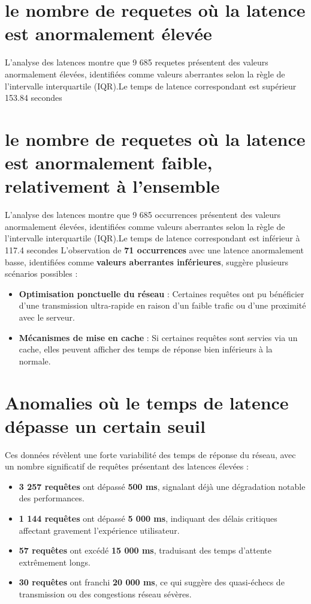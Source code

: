 \section{ le nombre de requetes où la latence est anormalement élevée}
L'analyse des latences montre que 9 685 requetes  présentent des valeurs anormalement élevées, identifiées comme valeurs aberrantes selon la règle de l'intervalle interquartile (IQR).Le temps de latence correspondant est supérieur 153.84 secondes

\section{ le nombre de requetes où la latence est anormalement faible, relativement à l'ensemble}
L'analyse des latences montre que 9 685 occurrences présentent des valeurs anormalement élevées, identifiées comme valeurs aberrantes selon la règle de l'intervalle interquartile (IQR).Le temps de latence correspondant est inférieur à 117.4 secondes
L'observation de \textbf{71 occurrences} avec une latence anormalement basse, identifiées comme \textbf{valeurs aberrantes inférieures}, suggère plusieurs scénarios possibles :

\begin{itemize}
	\item \textbf{Optimisation ponctuelle du réseau} : Certaines requêtes ont pu bénéficier d'une transmission ultra-rapide en raison d'un faible trafic ou d'une proximité avec le serveur.
	\item \textbf{Mécanismes de mise en cache} : Si certaines requêtes sont servies via un cache, elles peuvent afficher des temps de réponse bien inférieurs à la normale.
\end{itemize}

\section{Anomalies où le temps de latence dépasse un certain seuil}
\noindent Ces données révèlent une forte variabilité des temps de réponse du réseau, avec un nombre significatif de requêtes présentant des latences élevées :

\begin{itemize}
	\item \textbf{3 257 requêtes} ont dépassé \textbf{500 ms}, signalant déjà une dégradation notable des performances.
	\item \textbf{1 144 requêtes} ont dépassé \textbf{5 000 ms}, indiquant des délais critiques affectant gravement l'expérience utilisateur.
	\item \textbf{57 requêtes} ont excédé \textbf{15 000 ms}, traduisant des temps d'attente extrêmement longs.
	\item \textbf{30 requêtes} ont franchi \textbf{20 000 ms}, ce qui suggère des quasi-échecs de transmission ou des congestions réseau sévères.
\end{itemize}

